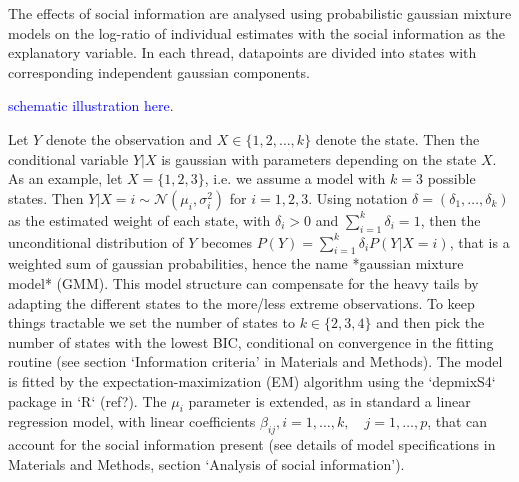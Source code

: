 \documentclass[9pt,twocolumn,twoside,lineno]{pnas-new}
\begin{document}
The effects of social information are analysed using probabilistic gaussian mixture models on the log-ratio of individual estimates with the social information as the explanatory variable. In each thread, datapoints are divided into states with corresponding independent gaussian components. 

\textcolor{blue}{schematic illustration here}. 

Let $Y$ denote the observation and $X\in\{1,2,\dots,k\}$ denote the state. Then the conditional variable $Y|X$ is gaussian with parameters depending on the state $X$. As an example, let $X=\{1,2,3\}$, i.e. we assume a model with $k=3$ possible states. Then $Y|X=i \sim \mathcal{N}(\mu_i,\sigma_i^2)$ for $i=1,2,3$. Using notation $\delta = (\delta_1,\dots,\delta_k)$ as the estimated weight of each state, with $\delta_i >0$ and $\sum_{i=1}^k\delta_i = 1$, then the unconditional distribution of $Y$ becomes $P(Y) = \sum_{i=1}^k \delta_i P(Y|X=i)$, that is a weighted sum of gaussian probabilities, hence the name *gaussian mixture model* (GMM). This model structure can compensate for the heavy tails by adapting the different states to the more/less extreme observations.  To keep things tractable we set the number of states to $k\in\{2,3,4\}$ and then pick the number of states with the lowest BIC, conditional on convergence in the fitting routine (see section `Information criteria' in Materials and Methods). The model is fitted by the expectation-maximization (EM) algorithm using the `depmixS4` package in `R` (ref?). The $\mu_i$ parameter is extended, as in standard a linear regression model, with linear coefficients $\beta_{ij}, i=1,\dots,k, \quad j=1,\dots,p$, that can account for the social information present (see details of model specifications in Materials and Methods, section `Analysis of social information').

\end{document}
